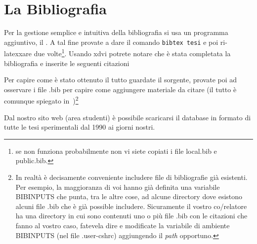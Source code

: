\chapter{La Bibliografia}

   Per la gestione semplice e intuitiva della bibliografia si usa un programma
   aggiuntivo, il \BibTeX. A tal fine provate a dare il comando
   \texttt{bibtex tesi} e poi ri-latexxare due volte\footnote{se non funziona
   probabilmente non vi siete copiati i file local.bib e public.bib.}.
   Usando xdvi potrete notare che \`e stata completata la bibliografia
   e inserite le seguenti citazioni~\cite{sql,cv1,itsc99,mpi-boselli,mpipov,isata99,spie99,ipps99,iv98-1,iv98-2,spie98,isata97,iv97,camp97,canpc,ica3pp97,eusipco96,iv96,icip96}

   Per capire come \`e stato ottenuto il tutto guardate il sorgente, 
   provate poi ad osservare i file .bib per capire come aggiungere materiale da
   citare (il tutto \`e comunque spiegato in~\cite{btxdoc})\footnote{In realt\`a
   \`e decisamente conveniente includere file di bibliografie gi\`a esistenti.
   Per esempio,
   la maggioranza di voi hanno gi\`a definita una variabile BIBINPUTS che punta, tra le altre cose, ad
   alcune directory dove esistono alcuni file .bib che \`e gi\`a possible
   includere. Sicuramente il vostro co/relatore ha una directory in cui sono contenuti
   uno o pi\`u file .bib con le citazioni che fanno al vostro caso, fatevela dire
   e modificate la variabile di ambiente BIBINPUTS (nel file .user-cshrc) aggiungendo
   il \emph{path} opportuno.}

   Dal nostro sito web (area studenti) è possibile scaricarsi il database in formato \BibTeX di
   tutte le tesi sperimentali dal 1990 ai giorni nostri.



